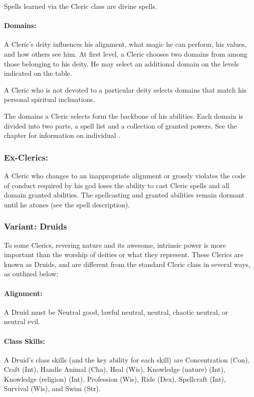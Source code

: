 Spells learned via the Cleric class are divine spells.
\paragraph{Domains:}
A Cleric's deity influences his alignment, what magic he can perform, his values, and how others see him. 
At first level, a Cleric chooses two domains from among those belonging to his deity.
He may select an additional domain on the levels indicated on the  table.

A Cleric who is not devoted to a particular deity selects domains that match his personal spiritual inclinations.

The domains a Cleric selects form the backbone of his abilities.
Each domain is divided into two parts, a spell list and a collection of granted powers.
See the  chapter for information on individual .
\subsubsection{Ex-Clerics:}
A Cleric who changes to an inappropriate alignment or grossly violates the code of conduct required by his god loses the ability to cast Cleric spells and all domain granted abilities.
The spellcasting and granted abilities remain dormant until he atones (see the  spell description).
\subsubsection[Druid]{Variant: Druids}
\label{sec:Druid}
To some Clerics, revering nature and its awesome, intrinsic power is more important than the worship of deities or what they represent.
These Clerics are known as Druids, and are different from the standard Cleric class in several ways, as outlined below:

\paragraph{Alignment:} A Druid must be Neutral good, lawful neutral, neutral, chaotic neutral, or neutral evil.

\paragraph{Class Skills:} A Druid's class skills (and the key ability for each skill) are Concentration (Con), Craft (Int), Handle Animal (Cha), Heal (Wis), Knowledge (nature) (Int), Knowledge (religion) (Int), Profession (Wis), Ride (Dex), Spellcraft (Int), Survival (Wis), and Swim (Str).

